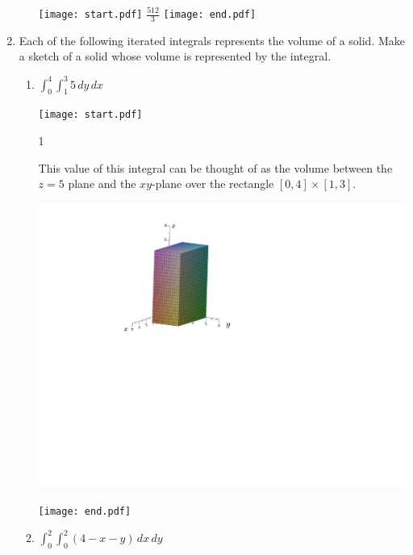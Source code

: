 \documentclass[12pt]{article}
\begin{document}
\begin{enumerate}
\begin{enumerate}
\texttt{[image: start.pdf]}
{{$\frac{512}{3}$}}
\texttt{[image: end.pdf]}


\end{enumerate}

\item Each of the following iterated integrals represents the volume of a solid.  Make a sketch of a solid whose volume is represented by the integral.  

\begin{enumerate}

\item $\int_0^4 \int_1^3 {5} \,dy \,dx$

\texttt{[image: start.pdf]}
{{{1\linewidth}{This value of this integral can be thought of as the volume between the $z=5$ plane and the $xy$-plane over the rectangle $[0,4]\times[1,3]$.\\
\begin{center}
\includegraphics[scale=0.4]{box.pdf}
\end{center}
}}}
\texttt{[image: end.pdf]}


\item $\int_0^2 \int_0^2 {(4-x-y)} \,dx \,dy$


\end{enumerate}
\end{enumerate}
\end{document}
